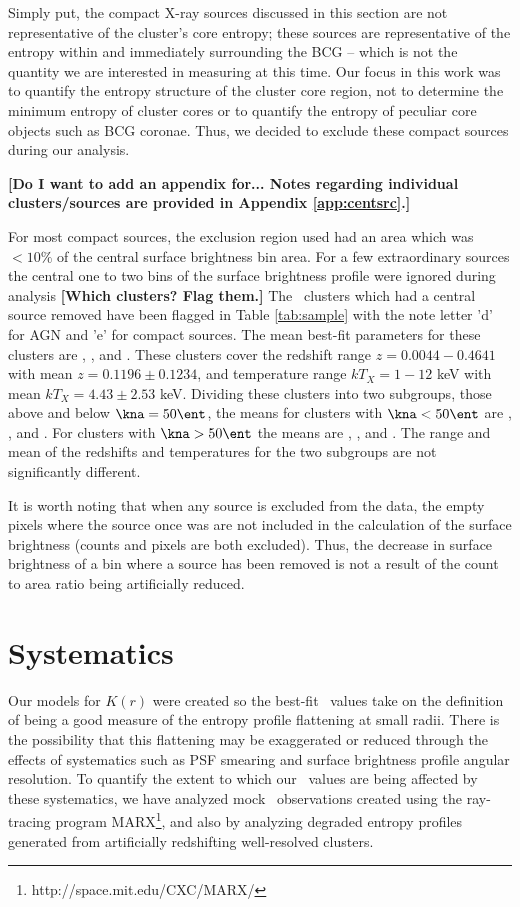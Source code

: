 \documentclass{emulateapj}
\begin{document}
Simply put, the compact X-ray sources discussed in this section are
not representative of the cluster's core entropy; these sources are
representative of the entropy within and immediately surrounding the
BCG -- which is not the quantity we are interested in measuring at
this time. Our focus in this work was to quantify the entropy
structure of the cluster core region, not to determine the minimum
entropy of cluster cores or to quantify the entropy of peculiar core
objects such as BCG coronae. Thus, we decided to exclude these compact
sources during our analysis.

{\bf{[Do I want to add an appendix for... Notes regarding individual
      clusters/sources are provided in Appendix \ref{app:centsrc}.]}}

For most compact sources, the exclusion region used had an area which
was $<10\%$ of the central surface brightness bin area. For a few
extraordinary sources the central one to two bins of the surface
brightness profile were ignored during analysis {\bf{[Which clusters?
      Flag them.]}} The \centsrcnum\ clusters which had a central
source removed have been flagged in Table \ref{tab:sample} with the
note letter 'd' for AGN and 'e' for compact sources. The mean best-fit
parameters for these clusters are \knacs, \alphacs, and \khuncs. These
clusters cover the redshift range $z = 0.0044-0.4641$ with mean $z =
0.1196 \pm 0.1234$, and temperature range $kT_X = 1-12$ keV with mean
$kT_X = 4.43 \pm 2.53$ keV. Dividing these clusters into two
subgroups, those above and below $\kna = 50 \ent$, the means for
clusters with $\kna < 50 \ent$ are \knacsa, \alphacsa, and
\khuncsa. For clusters with $\kna > 50 \ent$ the means are \knacsb,
\alphacsb, and \khuncsb. The range and mean of the redshifts and
temperatures for the two subgroups are not significantly different.

It is worth noting that when any source is excluded from the data, the
empty pixels where the source once was are not included in the
calculation of the surface brightness (counts and pixels are both
excluded). Thus, the decrease in surface brightness of a bin where a
source has been removed is not a result of the count to area ratio
being artificially reduced.

\section{Systematics}
\label{sec:sys}

Our models for $K(r)$ were created so the best-fit \kna\ values take
on the definition of being a good measure of the entropy profile
flattening at small radii. There is the possibility that this
flattening may be exaggerated or reduced through the effects of
systematics such as PSF smearing and surface brightness profile
angular resolution. To quantify the extent to which our \kna\ values
are being affected by these systematics, we have analyzed mock
\chandra\ observations created using the ray-tracing program
MARX\footnote{http://space.mit.edu/CXC/MARX/}, and also by analyzing
degraded entropy profiles generated from artificially redshifting
well-resolved clusters.
\end{document}
